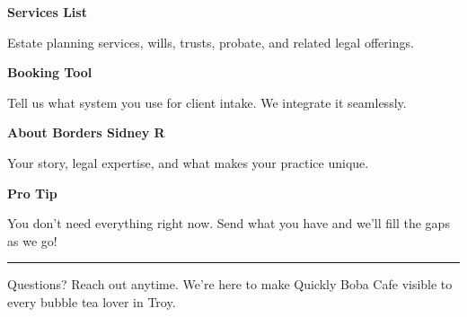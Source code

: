 \documentclass[11pt,letterpaper]{article}
\begin{document}
\hfill
\begin{minipage}[t]{0.48\textwidth}
\begin{tcolorbox}[colframe=accent-teal, boxrule=1pt, left=0.7em, right=0.7em, top=0.5em, bottom=0.5em, arc=4pt, boxsep=0pt]
{\bfseries\small\color{accent-teal}Services List}

\vspace{0.15em}

{\small Estate planning services, wills, trusts, probate, and related legal offerings.}
\end{tcolorbox}

\vspace{0.1em}

\begin{tcolorbox}[colframe=accent-teal, boxrule=1pt, left=0.7em, right=0.7em, top=0.5em, bottom=0.5em, arc=4pt, boxsep=0pt]
{\bfseries\small\color{accent-teal}Booking Tool}

\vspace{0.15em}

{\small Tell us what system you use for client intake. We integrate it seamlessly.}
\end{tcolorbox}

\vspace{0.1em}

\begin{tcolorbox}[colframe=accent-teal, boxrule=1pt, left=0.7em, right=0.7em, top=0.5em, bottom=0.5em, arc=4pt, boxsep=0pt]
{\bfseries\small\color{accent-teal}About Borders Sidney R}

\vspace{0.15em}

{\small Your story, legal expertise, and what makes your practice unique.}
\end{tcolorbox}

\vspace{-0.2em}
\end{minipage}

\vspace{0.15em}

\begin{tcolorbox}[colback={accent-red!5}, colframe=accent-red!20, boxrule=0.5pt, left=0.7em, right=0.7em, top=0.4em, bottom=0.4em, arc=6pt, boxsep=0pt]

{\bfseries\small\color{accent-red}Pro Tip}

\vspace{0.1em}

{\small You don't need everything right now. Send what you have and we'll fill the gaps as we go!}

\end{tcolorbox}

\vspace{0.15em}

\noindent\hrule
\vspace{0.2em}

{\small\color{text-light}Questions? Reach out anytime. We're here to make Quickly Boba Cafe visible to every bubble tea lover in Troy.}
\end{document}
